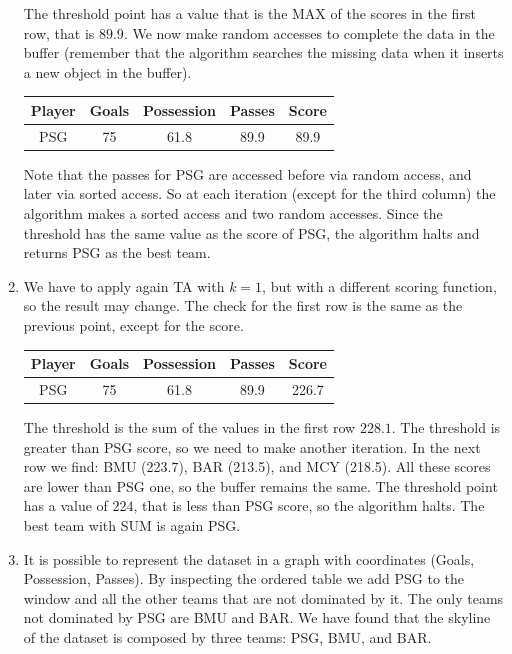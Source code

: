 \documentclass[12pt, a4paper]{report}
\newtheorem[style=M,bodystyle=\normalfont]{theorem}{Theorem}
\newtheorem[style=M,bodystyle=\normalfont]{corollary}{Corollary}
\newtheorem[style=M,bodystyle=\normalfont]{lemma}{Lemma}
\newtheorem[style=M,bodystyle=\normalfont]{definition}{Definition}
\begin{document}
\begin{enumerate}
                The threshold point has a value that is the MAX of the scores in the first row, that is $89.9$. We now make random 
                accesses to complete the data in the buffer (remember that the algorithm searches the missing data when it inserts a 
                new object in the buffer). 
                \begin{table}[H]
                    \centering
                    \begin{tabular}{c|ccc|c}
                    \hline
                    \textbf{Player} & \textbf{Goals} & \textbf{Possession} & \textbf{Passes} & \textbf{Score} \\ \hline
                    PSG             & 75             & 61.8                & 89.9            & 89.9           \\ \hline
                    \end{tabular}
                \end{table}
                Note that the passes for PSG are accessed before via random access, and later via sorted access. So at each iteration (except for 
                the third column) the algorithm makes a sorted access and two random accesses. Since the threshold has the same value as the score 
                of PSG, the algorithm halts and returns PSG as the best team. 
            \item We have to apply again TA with $k=1$, but with a different scoring function, so the result may change. The check for the 
                first row is the same as the previous point, except for the score.
                \begin{table}[H]
                    \centering
                    \begin{tabular}{c|ccc|c}
                    \hline
                    \textbf{Player} & \textbf{Goals} & \textbf{Possession} & \textbf{Passes} & \textbf{Score} \\ \hline
                    PSG             & 75             & 61.8                & 89.9            & 226.7           \\ \hline
                    \end{tabular}
                \end{table}
                The threshold is the sum of the values in the first row $228.1$. The threshold is greater than PSG score, so we need to make another 
                iteration. In the next row we find: BMU (223.7), BAR (213.5), and MCY (218.5). All these scores are lower than PSG one, so the buffer 
                remains the same. The threshold point has a value of $224$, that is less than PSG score, so the algorithm halts. The best team with 
                SUM is again PSG. 
            \item It is possible to represent the dataset in a graph with coordinates (Goals, Possession, Passes). By inspecting the ordered table we 
                add PSG to the window and all the other teams that are not dominated by it. The only teams not dominated by PSG are BMU and BAR. We have 
                found that the skyline of the dataset is composed by three teams: PSG, BMU, and BAR. 
        \end{enumerate}
\end{document}
